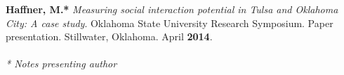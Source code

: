 \begin{cventries}
{\begin{cvitems}
            \end{cvitems}
            }
   \cventry
      {}
      {}
      {}
      {}
      {
        \begin{cvitems}
          \vspace{-2mm}
            \item {\textbf{Haffner, M.*} \textit{Measuring social interaction potential in Tulsa and Oklahoma City: A case study}. Oklahoma State University Research Symposium. Paper presentation. Stillwater, Oklahoma. April \textbf{2014}.} \\\\
            \textit{* Notes presenting author}
              \end{cvitems}
            }
\end{cventries}